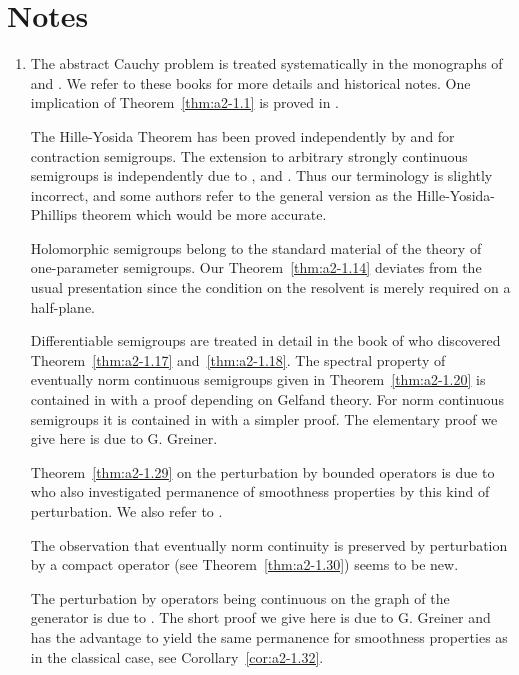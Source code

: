 \section*{Notes}\label{notes:a2-notes}
\begin{enumerate}[label=\emph{Section \arabic*:}, wide, itemsep=1ex]
\item
The abstract Cauchy problem is treated systematically in the monographs of \textcite{krein:1971} and \textcite{fattorini:1983}.
We refer to these books for more details and historical notes.
One implication of Theorem~\ref{thm:a2-1.1}   is proved in \textcite[Theorem 2.11]{krein:1971}.

The Hille-Yosida Theorem has been proved independently by \textcite{hille:1948} and \textcite{yosida:1948} for contraction semigroups.
The extension to arbitrary strongly continuous semigroups is independently due to \textcite{feller:1953a}, \textcite{miyadera:1952} and \textcite{phillips:1954}.
Thus our terminology is slightly incorrect, and some authors refer to the general version as the Hille-Yosida-Phillips theorem which would be more accurate. %

Holomorphic semigroups belong to the standard material of the theory of one-parameter semigroups.
Our Theorem~\ref{thm:a2-1.14}   deviates from the usual presentation since the condition on the resolvent is merely required on a half-plane.

Differentiable semigroups are treated in detail in the book of \textcite{pazy:1983} who discovered Theorem~\ref{thm:a2-1.17}   and~\ref{thm:a2-1.18}. 
The spectral property of eventually norm continuous semigroups given in Theorem~\ref{thm:a2-1.20}   is contained in \textcite[Theorem 16.4.2]{hillephillips:1957} with a proof depending on Gelfand theory.
For norm continuous semigroups it is contained in \textcite{pazy:1983} with a simpler proof.
The elementary proof we give here is due to G. Greiner.

Theorem~\ref{thm:a2-1.29}   on the perturbation by bounded operators is due to \textcite{phillips:1954} who also investigated permanence of smoothness properties by this kind of perturbation.
We also refer to \textcite[Section 3.1]{pazy:1983}.

The observation that eventually norm continuity is preserved by perturbation by a compact operator (see Theorem~\ref{thm:a2-1.30}) seems to be new.

The perturbation by operators being continuous on the graph of the generator is due to \textcite{deschschappacher:1984}.
The short proof we give here is due to G. Greiner and has the advantage to yield the same permanence for smoothness properties as in the classical case, see Corollary~\ref{cor:a2-1.32}. 


\end{enumerate}
